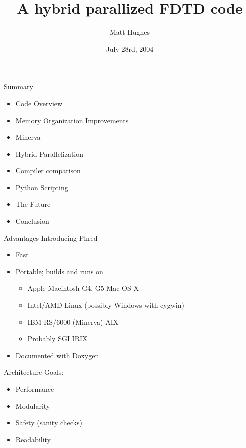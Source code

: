 \documentclass[pdf, nototal, slideBW]{prosper}
\title{A hybrid parallized FDTD code}
\author{Matt Hughes}
\date{July 28rd, 2004}
\begin{document}
\maketitle

\begin{slide}{Summary}

  \begin{itemize}
    \item Code Overview
    \item Memory Organization Improvements
    \item Minerva
    \item Hybrid Parallelization
    \item Compiler comparison
    \item Python Scripting
    \item The Future
    \item Conclusion
  \end{itemize}

\end{slide}

\begin{slide}{Advantages}
  Introducing Phred
  \begin{itemize}
  \item Fast
  \item Portable; builds and runs on
    \begin{itemize}
    \item Apple Macintosh G4, G5 Mac OS X
    \item Intel/AMD Linux (possibly Windows with cygwin)
    \item IBM RS/6000 (Minerva) AIX
    \item Probably SGI IRIX
    \end{itemize}
  \item Documented with Doxygen
  \end{itemize}
\end{slide}

\begin{slide}{Architecture}
  Goals:
  \begin{itemize}
  \item Performance
  \item Modularity
  \item Safety (sanity checks)
  \item Readability
  \end{itemize}

\end{slide}
\end{document}
